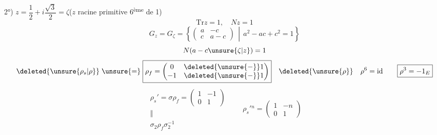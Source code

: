 2°) $z=\dfrac12+i\dfrac{\sqrt3}{2}=\zeta$\quad ($z$ racine primitive 6\textsuperscript{ème} de 1)
\[\mathrm{Tr}z=1,\quad Nz=1\]
\[
G_z=G_\zeta=\left\{\begin{pmatrix}a&-c\\c&a-c\end{pmatrix}\,\middle|\,a^2-ac+c^2=1\right\}
\]
\[N(a-c\unsure{\zeta|z})=1\]
\[
\deleted{\unsure{\rho_s|\rho}}\mathrel{\unsure{=}}
\boxed{\rho_f=\begin{pmatrix}0&\deleted{\unsure{-}}1\\-1&\deleted{\unsure{-}}1\end{pmatrix}}
\quad\deleted{\unsure{\rho}}\quad\rho^6=\mathrm{id}\qquad\boxed{\rho^3=-1_E}
\]
\[
\boxed{\begin{gathered}
\rho_s'=\sigma\rho_f=\begin{pmatrix}1&-1\\0&1\end{pmatrix}\\
\Vert\\
\sigma_2\rho_f\sigma_2^{-1}
\end{gathered}}
\qquad
\rho_s'{}^n=\begin{pmatrix}1&-n\\0&1\end{pmatrix}
\]
